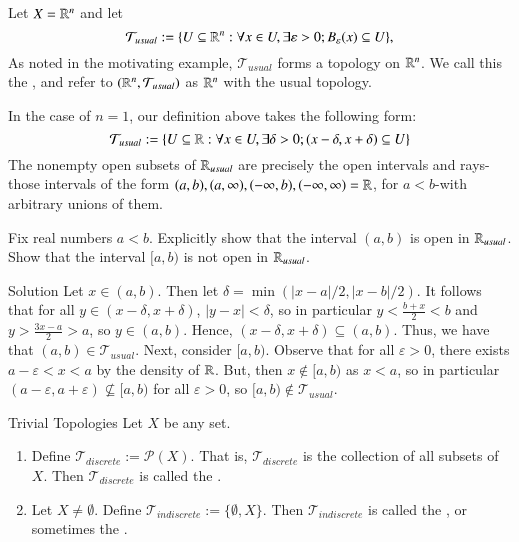 \documentclass[12pt, a4paper, twoside, openright, titlepage]{book}
\begin{document}
\begin{eg}{}{}
    Let $X = \mathbb R^n$ and let \begin{equation*}
        \mathcal{T}_{usual} := \{U\subseteq \mathbb R^n:\forall x \in U,\exists\varepsilon > 0; B_{\varepsilon}(x) \subseteq U\},
    \end{equation*}
    As noted in the motivating example, $\mathcal{T}_{usual}$ forms a topology on $\mathbb R^n$. We call this the , and refer to $(\mathbb R^n,\mathcal{T}_{usual})$ as $\mathbb R^n$ with the usual topology. 

    In the case of $n = 1$, our definition above takes the following form: \begin{equation*}
        \mathcal{T}_{usual} := \{U \subseteq \mathbb R:\forall x\in U,\exists \delta >0; (x-\delta,x+\delta)\subseteq U\}
    \end{equation*}
    The nonempty open subsets of $\mathbb R_{usual}$ are precisely the open intervals and rays\--those intervals of the form $(a,b), (a,\infty),(-\infty,b), (-\infty,\infty) = \mathbb R$, for $a < b$\--with arbitrary unions of them.
\end{eg}

\begin{xca*}{}{}
    Fix real numbers $a<b$. Explicitly show that the interval $(a,b)$ is open in $\mathbb R_{usual}$. Show that the interval $[a,b)$ is not open in $\mathbb R_{usual}$.
\end{xca*}
\begin{cust*}[separator sign={}]{Solution}{}
    Let $x \in (a,b)$. Then let $\delta = \min(|x-a|/2,|x-b|/2)$. It follows that for all $y \in (x-\delta, x+\delta)$, $|y-x| < \delta$, so in particular $y < \frac{b+x}{2} < b$ and $y > \frac{3x-a}{2} > a$, so $y \in (a,b)$. Hence, $(x-\delta,x+\delta) \subseteq (a,b)$. Thus, we have that $(a,b) \in \mathcal{T}_{usual}$. Next, consider $[a,b)$. Observe that for all $\varepsilon > 0$, there exists $a-\varepsilon < x < a$ by the density of $\mathbb R$. But, then $x \notin [a,b)$ as $x < a$, so in particular $(a-\varepsilon,a+\varepsilon) \nsubseteq [a,b)$ for all $\varepsilon > 0$, so $[a,b) \notin \mathcal{T}_{usual}$.
\end{cust*}

\begin{eg}{Trivial Topologies}{}
    Let $X$ be any set. \begin{enumerate}
        \item Define $\mathcal{T}_{discrete} := \mathcal{P}(X)$. That is, $\mathcal{T}_{discrete}$ is the collection of all subsets of $X$. Then $\mathcal{T}_{discrete}$ is called the .
        \item Let $X \neq \emptyset$. Define $\mathcal{T}_{indiscrete} :=\{\emptyset,X\}$. Then $\mathcal{T}_{indiscrete}$ is called the , or sometimes the .
    \end{enumerate}
\end{eg}
\end{document}
